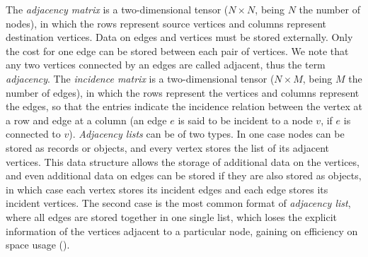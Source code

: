\documentclass[binding=0.6cm]{sapthesis}
\newcommand{\mycite}[1]{(\cite{#1})}
\begin{document}

The \textit{adjacency matrix} is a two-dimensional tensor ($N \times N$, being $N$ the number of nodes), in which the rows represent source vertices and columns represent destination vertices. Data on edges and vertices must be stored externally. Only the cost for one edge can be stored between each pair of vertices. We note that any two vertices connected by an edges are called adjacent, thus the term \textit{adjacency}. The \textit{incidence matrix} is a two-dimensional tensor ($N \times M$, being $M$ the number of edges), in which the rows represent the vertices and columns represent the edges, so that the entries indicate the incidence relation between the vertex at a row and edge at a column (an edge $e$ is said to be incident to a node $v$, if $e$ is connected to $v$). \textit{Adjacency lists} can be of two types. In one case nodes can be stored as records or objects, and every vertex stores the list of its adjacent vertices. This data structure allows the storage of additional data on the vertices, and even additional data on edges can be stored if they are also stored as objects, in which case each vertex stores its incident edges and each edge stores its incident vertices. The second case is the most common format of \textit{adjacency list}, where all edges are stored together in one single list, which loses the explicit information of the vertices adjacent to a particular node, gaining on efficiency on space usage \mycite{cormen2022introduction}.  
\end{document}

